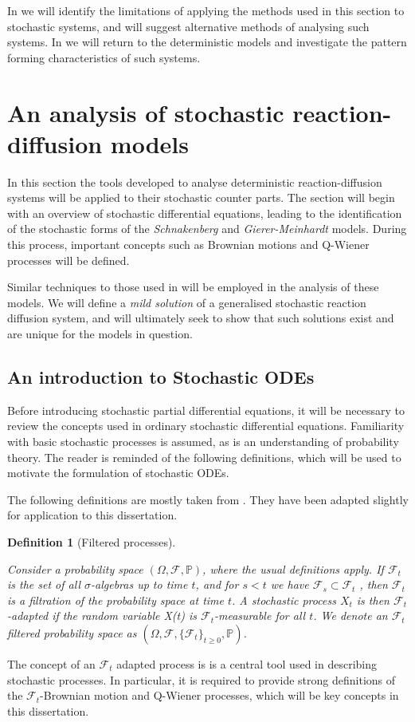 \documentclass[12pt]{article}
\newtheorem{definition}{Definition}[section]
\begin{document}
In  we will identify the limitations of applying the methods used in this section to stochastic systems, and will suggest alternative methods of analysing such systems. In  we will return to the deterministic models and investigate the pattern forming characteristics of such systems.

\section{An analysis of stochastic reaction-diffusion models}
In this section the tools developed to analyse deterministic reaction-diffusion systems will be applied to their stochastic counter parts. The section will begin with an overview of stochastic differential equations, leading to the identification of the stochastic forms of the \textit{Schnakenberg} and \textit{Gierer-Meinhardt} models. During this process, important concepts such as Brownian motions and Q-Wiener processes will be defined. 

Similar techniques to those used in  will be employed in the analysis of these models. We will define a \textit{mild solution} of a generalised stochastic reaction diffusion system, and will ultimately seek to show that such solutions exist and are unique for the models in question. 

\subsection{An introduction to Stochastic ODEs}

Before introducing stochastic partial differential equations, it will be necessary to review the concepts used in ordinary stochastic differential equations. Familiarity with basic stochastic processes is assumed, as is an understanding of probability theory. The reader is reminded of the following definitions, which will be used to motivate the formulation of stochastic ODEs. 

The following definitions are mostly taken from \cite{Lord}. They have been adapted slightly for application to this dissertation.
\begin{definition}[Filtered processes]\cite{Lord, Chow}

Consider a probability space $(\Omega, \mathcal{F}, \mathbb{P})$, where the usual definitions apply. If $\mathcal{F}_t$ is the set of all $\sigma$-algebras up to time $t$, and for $s < t$ we have $\mathcal{F}_s \subset\mathcal{F}_t$ , then $\mathcal{F}_t$ is a filtration of the probability space at time $t$. A stochastic process $X_t$ is then $\mathcal{F}_t$-adapted if the random variable X(t) is $\mathcal{F}_t$-measurable for all $t$. We denote an $\mathcal{F}_t$ filtered probability space as $(\Omega, \mathcal{F}, \lbrace \mathcal{F}_t\rbrace_{t\geq 0}, \mathbb{P})$.
\end{definition}
The concept of an $\mathcal{F}_t$ adapted process is is a central tool used in describing stochastic processes. In particular, it is required to provide strong definitions of the $\mathcal{F}_t$-Brownian motion and Q-Wiener processes, which will be key concepts in this dissertation. 
\end{document}
